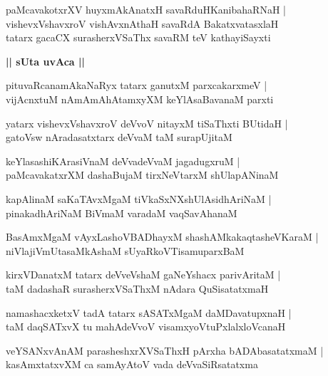 \documentclass[twoside,12pt,openright]{book}
\newcounter{shloka}[chapter]
\def\uvaca#1{\centerline{{\large\textbf{#1}}}}
\begin{document}
\begin{shloka}%
paMcavakotxrXV huyxmAkAnatxH savaRduHKanibahaRNaH |\\
vishevxVshavxroV vishAvxnAthaH savaRdA BakatxvatasxlaH \\
tatarx gacaCX surasherxVSaThx savaRM teV kathayiSayxti
\end{shloka}

\uvaca{|| sUta uvAca ||}

\begin{shloka}%
pituvaRcanamAkaNaRyx tatarx ganutxM parxcakarxmeV |\\
vijAcnxtuM nAmAmAhAtamxyXM keYlAsaBavanaM parxti
\end{shloka}

\begin{shloka}%
yatarx vishevxVshavxroV deVvoV nitayxM tiSaThxti BUtidaH |\\
gatoVsw nAradasatxtarx deVvaM taM surapUjitaM 
\end{shloka}

\begin{shloka}%
keYlasashiKArasiVnaM deVvadeVvaM jagadugxruM |\\
paMcavakatxrXM dashaBujaM tirxNeVtarxM shUlapANinaM
\end{shloka}

\begin{shloka}%
kapAlinaM saKaTAvxMgaM tiVkaSxNXshUlAsidhAriNaM |\\
pinakadhAriNaM BiVmaM varadaM vaqSavAhanaM 
\end{shloka}

\begin{shloka}%
BasAmxMgaM vAyxLashoVBADhayxM shashAMkakaqtasheVKaraM |\\
niVlajiVmUtasaMkAshaM sUyaRkoVTisamuparxBaM 
\end{shloka}

\begin{shloka}%
kirxVDanatxM tatarx deVveVshaM gaNeYshacx parivAritaM  |\\
taM dadashaR surasherxVSaThxM nAdara QuSisatatxmaH 
\end{shloka}

\begin{shloka}%
namashacxketxV tadA tatarx sASATxMgaM daMDavatupxnaH |\\
taM daqSATxvX tu mahAdeVvoV visamxyoVtuPxlalxloVcanaH 
\end{shloka}

\begin{shloka}%
veYSANxvAnAM parasheshxrXVSaThxH pArxha bADAbasatatxmaM |\\
kasAmxtatxvXM ca samAyAtoV vada deVvaSiRsatatxma
\end{shloka}
\end{document}
